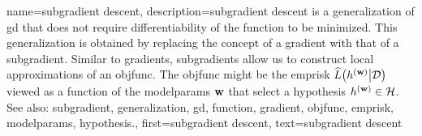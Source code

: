 {name={subgradient descent}, 
	description={\Gls{subgradient} 
		descent is a \gls{generalization} of \gls{gd} that does not require differentiability of the 
		\gls{function} to be minimized. This \gls{generalization} is obtained by replacing the concept 
		of a \gls{gradient} with that of a \gls{subgradient}. Similar to \glspl{gradient}, \glspl{subgradient} 
		allow us to construct local approximations of an \gls{objfunc}. The \gls{objfunc} 
		might be the \gls{emprisk} $\widehat{L}\big( h^{({\bf w})} \big| \mathcal{D} \big)$ viewed 
		as a \gls{function} of the \glspl{modelparam} ${\bf w}$ that select a \gls{hypothesis} $h^{({\bf w})} \in \mathcal{H}$.
				\\
		See also: \gls{subgradient}, \gls{generalization}, \gls{gd}, \gls{function}, \gls{gradient}, \gls{objfunc}, \gls{emprisk}, \glspl{modelparam}, \gls{hypothesis}.},
	first={subgradient descent},
	text={subgradient descent} 
}
	
